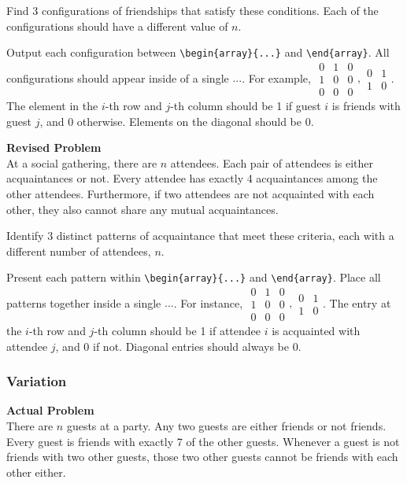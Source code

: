 Find $3$ configurations of friendships that satisfy these conditions. Each of the configurations should have a different value of $n$.

Output each configuration between \verb|\begin{array}{...}| and \verb|\end{array}|. All configurations should appear inside of a single $\boxed{...}$. For example, $\boxed{\begin{array}{ccc}0 & 1 & 0 \\ 1 & 0 & 0 \\ 0 & 0 & 0\end{array},\begin{array}{cc}0 & 1 \\ 1 & 0\end{array}}$.
The element in the $i$-th row and $j$-th column should be 1 if guest $i$ is friends with guest $j$, and 0 otherwise. Elements on the diagonal should be 0.

\textbf{Revised Problem}\\
At a social gathering, there are $n$ attendees. Each pair of attendees is either acquaintances or not. Every attendee has exactly 4 acquaintances among the other attendees. Furthermore, if two attendees are not acquainted with each other, they also cannot share any mutual acquaintances.

Identify $3$ distinct patterns of acquaintance that meet these criteria, each with a different number of attendees, $n$.

Present each pattern within \verb|\begin{array}{...}| and \verb|\end{array}|. Place all patterns together inside a single $\boxed{...}$. For instance, $\boxed{\begin{array}{ccc}0 & 1 & 0 \\ 1 & 0 & 0 \\ 0 & 0 & 0\end{array},\begin{array}{cc}0 & 1 \\ 1 & 0\end{array}}$. The entry at the $i$-th row and $j$-th column should be 1 if attendee $i$ is acquainted with attendee $j$, and 0 if not. Diagonal entries should always be 0.

\subsubsection{Variation}
\textbf{Actual Problem}\\
There are $n$ guests at a party. Any two guests are either friends or not friends. Every guest is friends with exactly 7 of the other guests. Whenever a guest is not friends with two other guests, those two other guests cannot be friends with each other either.

